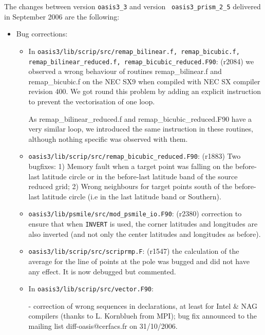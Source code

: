 The changes between version {\tt oasis3\_3} and version {\tt
  oasis3\_prism\_2\_5} delivered in September 2006 are the following:

\begin{itemize}

\item Bug corrections:

  \begin{itemize}

  \item In {\tt oasis3/lib/scrip/src/remap\_bilinear.f, remap\_bicubic.f,
      \break remap\_bilinear\_reduced.f, remap\_bicubic\_reduced.F90}:
    (r2084) we observed a wrong behaviour of routines
    remap\_bilinear.f and remap\_bicubic.f on the NEC SX9 when
    compiled with NEC SX compiler revision 400. We got round this
    problem by adding an explicit instruction to prevent the
    vectorisation of one loop.

    As remap\_bilinear\_reduced.f and remap\_bicubic\_reduced.F90 have
    a very similar loop, we introduced the same instruction in these
    routines, although nothing specific was observed with them.
  
  \item {\tt oasis3/lib/scrip/src/remap\_bicubic\_reduced.F90}:
    (r1883) Two bugfixes: 1) Memory fault when a target point was falling on the
    before-last latitude circle or in the before-last latitude band of
    the source reduced grid; 2) Wrong neighbours for target points
    south of the before-last latitude circle (i.e in the last latitude
    band or Southern).
 
  \item {\tt oasis3/lib/psmile/src/mod\_psmile\_io.F90}: (r2380)
    correction to ensure that when {\tt INVERT} is used, the corner
    latitudes and longitudes are also inverted (and not only the
    center latitudes and longitudes as before).

  \item {\tt oasis3/lib/scrip/src/scriprmp.F}: (r1547) the calculation
    of the average for the line of points at the pole was bugged and
    did not have any effect. It is now debugged but commented.

  \item In {\tt oasis3/lib/scrip/src/vector.F90}: 
    
    - correction of
    wrong sequences in declarations, at least for Intel \& NAG
    compilers (thanks to L. Kornblueh from MPI); bug fix announced to
    the mailing list diff-oasis@cerfacs.fr on 31/10/2006.
    

\end{itemize}
\end{itemize}
